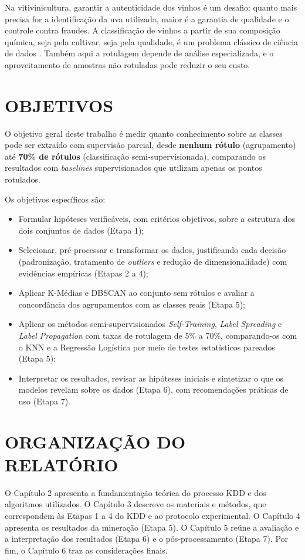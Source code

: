 Na vitivinicultura, garantir a autenticidade dos vinhos é um desafio: quanto mais precisa for a identificação da uva utilizada, maior é a garantia de qualidade e o controle contra fraudes. A classificação de vinhos a partir de sua composição química, seja pela cultivar, seja pela qualidade, é um problema clássico de ciência de dados \citep{girardi2025xwines, siddhardhan_wine}. Também aqui a rotulagem depende de análise especializada, e o aproveitamento de amostras não rotuladas pode reduzir o seu custo.

\section{OBJETIVOS}

O objetivo geral deste trabalho é medir quanto conhecimento sobre as classes pode ser extraído com supervisão parcial, desde \textbf{nenhum rótulo} (agrupamento) até \textbf{70\% de rótulos} (classificação semi-supervisionada), comparando os resultados com \textit{baselines} supervisionados que utilizam apenas os pontos rotulados.

Os objetivos específicos são:

\begin{itemize}
    \item Formular hipóteses verificáveis, com critérios objetivos, sobre a estrutura dos dois conjuntos de dados (Etapa 1);
    \item Selecionar, pré-processar e transformar os dados, justificando cada decisão (padronização, tratamento de \textit{outliers} e redução de dimensionalidade) com evidências empíricas (Etapas 2 a 4);
    \item Aplicar K-Médias e DBSCAN ao conjunto sem rótulos e avaliar a concordância dos agrupamentos com as classes reais (Etapa 5);
    \item Aplicar os métodos semi-supervisionados \textit{Self-Training}, \textit{Label Spreading} e \textit{Label Propagation} com taxas de rotulagem de 5\% a 70\%, comparando-os com o KNN e a Regressão Logística por meio de testes estatísticos pareados (Etapa 5);
    \item Interpretar os resultados, revisar as hipóteses iniciais e sintetizar o que os modelos revelam sobre os dados (Etapa 6), com recomendações práticas de uso (Etapa 7).
\end{itemize}

\section{ORGANIZAÇÃO DO RELATÓRIO}

O Capítulo 2 apresenta a fundamentação teórica do processo KDD e dos algoritmos utilizados. O Capítulo 3 descreve os materiais e métodos, que correspondem às Etapas 1 a 4 do KDD e ao protocolo experimental. O Capítulo 4 apresenta os resultados da mineração (Etapa 5). O Capítulo 5 reúne a avaliação e a interpretação dos resultados (Etapa 6) e o pós-processamento (Etapa 7). Por fim, o Capítulo 6 traz as considerações finais.
